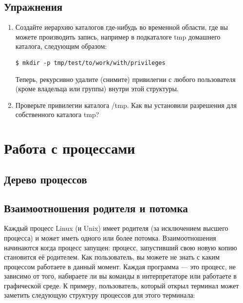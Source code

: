 \documentclass[10pt]{book}
\begin{document}
{\color{white}\section{Упражнения}}
\begin{tcolorbox}[title=\textbf{Упражнения}, colback=yellow!14!white, colframe=red!75!white]
\begin{enumerate}
 
\item Создайте иерархию каталогов где-нибудь во временной области, где вы можете производить запись, например в подкаталоге tmp домашнего каталога, следующим образом:
\begin{lstlisting}
$ mkdir -p tmp/test/to/work/with/privileges
\end{lstlisting}
Теперь, рекурсивно удалите (снимите) привилегии с любого пользователя (кроме владельца или группы) внутри этой структуры.
\item  Проверьте привилегии каталога /tmp. Как вы установили разрешения для собственного каталога tmp?
\end{enumerate}
\end{tcolorbox}

\newpage

\chapter{Работа с процессами}

\section*{Дерево процессов}

\section{Взаимоотношения родителя и потомка}

Каждый процесс Linux (и Unix) имеет родителя (за исключением высшего процесса) и может иметь одного или более потомка. Взаимоотношения начинаются когда процесс запущен: процесс, запустивший свою новую копию становится её родителем. Как пользователь, вы можете не знать с каким процессом  работаете в данный момент. Каждая программа — это процесс, не зависимо от того, набираете ли вы команды в интерпретаторе или работаете в графической среде.
К примеру, пользователь, который открыл терминал может заметить следующую структуру процессов для этого терминала:
\end{document}
